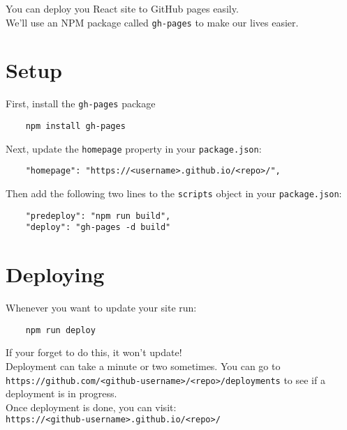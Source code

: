 You can deploy you React site to GitHub pages easily.
\\

We'll use an NPM package called \texttt{gh-pages} to make our lives easier.

\section{Setup}

First, install the \texttt{gh-pages} package

\begin{verbatim}
    npm install gh-pages
\end{verbatim}

Next, update the \texttt{homepage} property in your \texttt{package.json}:

\begin{verbatim}
    "homepage": "https://<username>.github.io/<repo>/",
\end{verbatim}

Then add the following two lines to the \texttt{scripts} object in your \texttt{package.json}:

\begin{verbatim}
    "predeploy": "npm run build",
    "deploy": "gh-pages -d build"
\end{verbatim}


\pagebreak


\section{Deploying}

Whenever you want to update your site run:

\begin{verbatim}
    npm run deploy
\end{verbatim}

If your forget to do this, it won't update!
\\

Deployment can take a minute or two sometimes. You can go to \\ \texttt{https://github.com/<github-username>/<repo>/deployments} to see if a deployment is in progress.
\\

Once deployment is done, you can visit:\\ \texttt{https://<github-username>.github.io/<repo>/}
